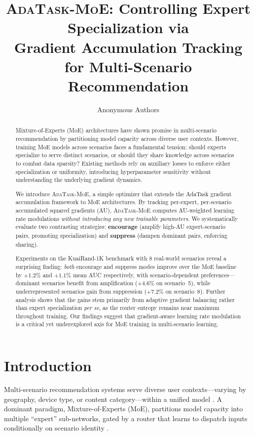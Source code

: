 \documentclass{article}
\title{\textsc{AdaTask-MoE}: Controlling Expert Specialization via \\
Gradient Accumulation Tracking for Multi-Scenario Recommendation}
\author{Anonymous Authors}
\begin{document}
\maketitle

\begin{abstract}
Mixture-of-Experts (MoE) architectures have shown promise in multi-scenario recommendation by partitioning model capacity across diverse user contexts.
However, training MoE models across scenarios faces a fundamental tension:
should experts specialize to serve distinct scenarios, or should they share knowledge across scenarios to combat data sparsity?
Existing methods rely on auxiliary losses to enforce either specialization or uniformity, introducing hyperparameter sensitivity without understanding the underlying gradient dynamics.

We introduce \textsc{AdaTask-MoE}, a simple optimizer that extends the AdaTask gradient accumulation framework to MoE architectures.
By tracking per-expert, per-scenario accumulated squared gradients (AU), \textsc{AdaTask-MoE} computes AU-weighted learning rate modulations \emph{without introducing any new trainable parameters}.
We systematically evaluate two contrasting strategies: \textbf{encourage} (amplify high-AU expert-scenario pairs, promoting specialization) and \textbf{suppress} (dampen dominant pairs, enforcing sharing).

Experiments on the KuaiRand-1K benchmark with 8 real-world scenarios reveal a surprising finding: \emph{both} encourage and suppress modes improve over the MoE baseline by $+1.2\%$ and $+1.1\%$ mean AUC respectively, with scenario-dependent preferences---dominant scenarios benefit from amplification ($+4.6\%$ on scenario~5), while underrepresented scenarios gain from suppression ($+7.2\%$ on scenario~8).
Further analysis shows that the gains stem primarily from adaptive gradient balancing rather than expert specialization \emph{per se}, as the router entropy remains near maximum throughout training.
Our findings suggest that gradient-aware learning rate modulation is a critical yet underexplored axis for MoE training in multi-scenario learning.
\end{abstract}

\section{Introduction}
\label{sec:intro}

Multi-scenario recommendation systems serve diverse user contexts---varying by geography, device type, or content category---within a unified model \cite{sheng2021one, tang2022pepnet}.
A dominant paradigm, Mixture-of-Experts (MoE), partitions model capacity into multiple ``expert'' sub-networks, gated by a router that learns to dispatch inputs conditionally on scenario identity \cite{shazeer2017outrageously, jacobs1991adaptive}.
\end{document}
